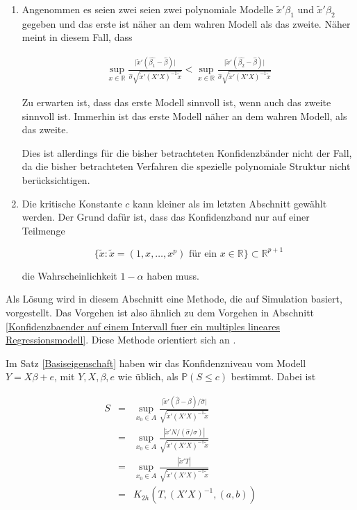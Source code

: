 \documentclass[12pt,a4paper]{article}
\theoremstyle{definition}
\theoremstyle{definition}
\theoremstyle{definition}
\theoremstyle{definition}
\begin{document}
\begin{enumerate}
\item Angenommen es seien zwei seien zwei polynomiale Modelle $\tilde{x}' \beta_1$ und $\tilde{x}' \beta_2$ gegeben und das erste ist näher an dem wahren Modell als das zweite. Näher meint in diesem Fall, dass

\begin{align*}
\sup_{x \in \mathbb{R}} \frac{\vert \tilde{x}'(\hat{\beta_1} - \hat{\beta}) \vert}{\hat{\sigma} \sqrt{\tilde{x}'(X'X)^{-1}\tilde{x}}} < 
\sup_{x \in \mathbb{R}} \frac{\vert \tilde{x}'(\hat{\beta_2} - \hat{\beta}) \vert}{\hat{\sigma} \sqrt{\tilde{x}'(X'X)^{-1}\tilde{x}}}
\end{align*}

Zu erwarten ist, dass das erste Modell sinnvoll ist, wenn auch das zweite sinnvoll ist. Immerhin ist das erste Modell näher an dem wahren Modell, als das zweite.

Dies ist allerdings für die bisher betrachteten Konfidenzbänder nicht der Fall, da die bisher betrachteten Verfahren die spezielle polynomiale Struktur nicht berücksichtigen. 

\item Die kritische Konstante $c$ kann kleiner als im letzten Abschnitt gewählt werden. Der Grund dafür ist, dass das Konfidenzband nur auf einer Teilmenge 

\begin{equation*}
\{ \tilde{x} : \tilde{x}=(1,x,\ldots,x^p) \text{ für ein } x \in \mathbb{R}\} \subset \mathbb{R}^{p+1}
\end{equation*}

die Wahrscheinlichkeit $1-\alpha$ haben muss.
\end{enumerate}

Als Lösung wird in diesem Abschnitt eine Methode, die auf Simulation basiert, vorgestellt. Das Vorgehen ist also ähnlich zu dem Vorgehen in Abschnitt \ref{Konfidenzbaender auf einem Intervall fuer ein multiples lineares Regressionsmodell}. Diese Methode orientiert sich an \cite[183,184]{Liu64}.

Im Satz \ref{Basiseigenschaft} haben wir das Konfidenzniveau vom Modell $Y=X\beta+e$, mit $Y,X,\beta,e$ wie üblich, als $\mathbb{P}(S \leq c)$ bestimmt. Dabei ist

\begin{eqnarray*}
S &=& \sup_{x_{0} \in A} \frac{\vert \tilde{x}'(\hat{\beta}-\beta) /\hat{\sigma} \vert}{\sqrt{\tilde{x}'(X'X)^{-1}\tilde{x}}} \\
&=& \sup_{x_{0} \in A} \frac{|\tilde{x}'N/(\hat{\sigma}/\sigma)|}{\sqrt{\tilde{x}'(X'X)^{-1}\tilde{x}}} \\
&=& \sup_{x_{0} \in A} \frac{| \tilde{x}'T |}{\sqrt{\tilde{x}'(X'X)^{-1}\tilde{x}}} \\
&=& K_{2h}(T,(X'X)^{-1},(a,b))
\end{eqnarray*}
\end{document}
